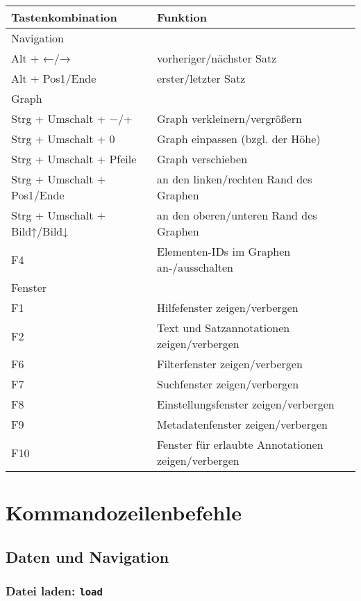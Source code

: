\documentclass[12pt]{scrartcl}
\begin{document}
\begin{center}
	\begin{tabular*}{\textwidth}{ll}
		\toprule
		Tastenkombination & Funktion \\
		\midrule
		Navigation & \\
		\midrule
			Alt + ←/→ & vorheriger/nächster Satz \\
			Alt + Pos1/Ende & erster/letzter Satz \\
		\midrule
		Graph & \\
		\midrule
			Strg + Umschalt + −/+ & Graph verkleinern/vergrößern \\
			Strg + Umschalt + 0 & Graph einpassen (bzgl. der Höhe) \\
			Strg + Umschalt + Pfeile & Graph verschieben \\
			Strg + Umschalt + Pos1/Ende & an den linken/rechten Rand des Graphen \\
			Strg + Umschalt + Bild↑/Bild↓ & an den oberen/unteren Rand des Graphen \\
			F4 & Elementen-IDs im Graphen an-/ausschalten\\
		\midrule
		Fenster & \\
		\midrule
			F1 & Hilfefenster zeigen/verbergen\\
			F2 & Text und Satzannotationen zeigen/verbergen\\
			F6 & Filterfenster zeigen/verbergen\\
			F7 & Suchfenster zeigen/verbergen\\
			F8 & Einstellungsfenster zeigen/verbergen\\
			F9 & Metadatenfenster zeigen/verbergen\\
			F10 & Fenster für erlaubte Annotationen zeigen/verbergen\\
		\bottomrule
	\end{tabular*}
\end{center}





\section{Kommandozeilenbefehle}

\subsection{Daten und Navigation}

\subsubsection{Datei laden: \texttt{load}}
\end{document}
